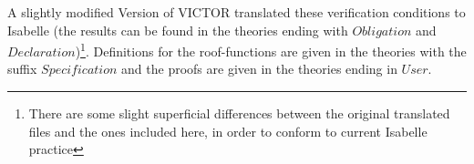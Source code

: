\documentclass[11pt,a4paper]{article}
\begin{document}
A slightly modified Version of VICTOR \cite{vct} translated these verification
conditions to Isabelle (the results can be found in the theories ending with
$Obligation$ and $Declaration$)\footnote{There are some slight superficial
differences between the original translated files and the ones included here,
in order to conform to current Isabelle practice}. Definitions for the
roof-functions are given in the theories with the suffix $Specification$ and the
proofs are given in the theories ending in $User$.






\end{document}
